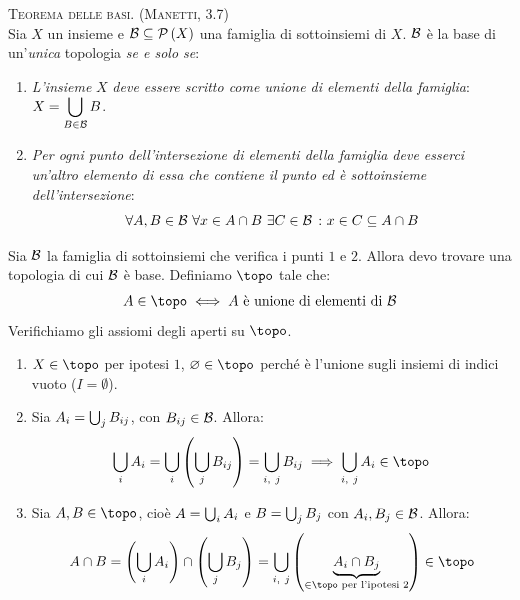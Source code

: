 \begin{theorema}\textsc{Teorema delle basi. (Manetti, 3.7)}\label{teoremabasi}\\
	Sia $X$ un insieme e $\mathcal{B}\subseteq\mathcal{P}\left(X\right)$ una famiglia di sottoinsiemi di $X$. $\mathcal{B}$ è la base di un'\textit{unica} topologia \textit{se e solo se}:
	\begin{enumerate}
		\item \textit{L'insieme} $X$ \textit{deve essere scritto come unione di elementi della famiglia}: $\displaystyle X=\mathop{{\bigcup}}\displaylimits_{B\in \mathcal{B}}B$.
		\item \textit{Per ogni punto dell'intersezione di elementi della famiglia deve esserci un'altro elemento di essa che contiene il punto ed è sottoinsieme dell'intersezione}:
		\begin{equation}
			\forall A, B\in\mathcal{B}\ \forall x\in A\cap B\ \exists C\in \mathcal{B}\ \colon x\in C\subseteq A\cap B
		\end{equation}
	\end{enumerate}
\end{theorema}
\begin{demonstration}
	Sia $\mathcal{B}$ la famiglia di sottoinsiemi che verifica i punti $1$ e $2$. Allora devo trovare una topologia di cui $\mathcal{B}$ è base. Definiamo $\topo$ tale che:
	\begin{equation*}
		A\in\topo\iff A\text{ è unione di elementi di }\basis
	\end{equation*}
	Verifichiamo gli assiomi degli aperti su $\topo$.
	\begin{enumerate}[label=\Roman*]
		\item $X\in\topo$ per ipotesi $1$, $\emptyset\in\topo$ perché è l'unione sugli insiemi di indici vuoto ($I=\emptyset$).
		\item Sia $A_i=\mathop{{\bigcup}}\displaylimits_{j}B_{ij}$, con $B_{ij}\in\mathcal{B}$. Allora:
		\begin{equation*}
			\union_{i}A_i=\union_{i}\left(\union_{j}B_{ij}\right)=\union_{i,\ j}B_{ij}\implies\union_{i,\ j}A_i\in\topo
		\end{equation*}
		\item Sia $A, B\in\topo$, cioè $A=\mathop{{\bigcup}}\displaylimits_{i}A_i$ e $B=\mathop{{\bigcup}}\displaylimits_{j}B_j$ con $A_i, B_j\in\mathcal{B}$. Allora:
		\begin{equation*}
			A\cap B=\left(\union_{i}A_i\right)\cap\left(\union_{j}B_j\right)=\union_{i,\ j}\left(\underbrace{A_i\cap B_j}_{\in\topo\text{ per l'ipotesi }2}\right)\in\topo%
		\end{equation*}
	\end{enumerate}
\end{demonstration}
